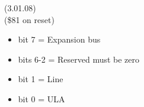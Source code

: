  (3.01.08)\\
(\$81 on reset)
\begin{itemize}
\item bit 7 = Expansion bus 
\item bits 6-2 = Reserved must be zero
\item bit 1 = Line
\item bit 0 = ULA
\end{itemize}

